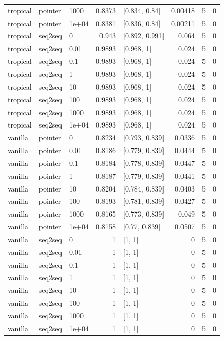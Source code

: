 \documentclass[10pt]{article}
\begin{document}
{\begin{longtable}{lllrlrrr}
tropical & pointer & 1000 & 0.8373 & [0.834, 0.84] & 0.00418 & 5 & 0\\
tropical & pointer & 1e+04 & 0.8381 & [0.836, 0.84] & 0.00211 & 5 & 0\\
tropical & seq2seq & 0 & 0.943 & [0.892, 0.991] & 0.064 & 5 & 0\\
tropical & seq2seq & 0.01 & 0.9893 & [0.968, 1] & 0.024 & 5 & 0\\
tropical & seq2seq & 0.1 & 0.9893 & [0.968, 1] & 0.024 & 5 & 0\\
tropical & seq2seq & 1 & 0.9893 & [0.968, 1] & 0.024 & 5 & 0\\
tropical & seq2seq & 10 & 0.9893 & [0.968, 1] & 0.024 & 5 & 0\\
tropical & seq2seq & 100 & 0.9893 & [0.968, 1] & 0.024 & 5 & 0\\
tropical & seq2seq & 1000 & 0.9893 & [0.968, 1] & 0.024 & 5 & 0\\
tropical & seq2seq & 1e+04 & 0.9893 & [0.968, 1] & 0.024 & 5 & 0\\
vanilla & pointer & 0 & 0.8234 & [0.793, 0.839] & 0.0336 & 5 & 0\\
vanilla & pointer & 0.01 & 0.8186 & [0.779, 0.839] & 0.0444 & 5 & 0\\
vanilla & pointer & 0.1 & 0.8184 & [0.778, 0.839] & 0.0447 & 5 & 0\\
vanilla & pointer & 1 & 0.8187 & [0.779, 0.839] & 0.0441 & 5 & 0\\
vanilla & pointer & 10 & 0.8204 & [0.784, 0.839] & 0.0403 & 5 & 0\\
vanilla & pointer & 100 & 0.8193 & [0.781, 0.839] & 0.0427 & 5 & 0\\
vanilla & pointer & 1000 & 0.8165 & [0.773, 0.839] & 0.049 & 5 & 0\\
vanilla & pointer & 1e+04 & 0.8158 & [0.77, 0.839] & 0.0507 & 5 & 0\\
vanilla & seq2seq & 0 & 1 & [1, 1] & 0 & 5 & 0\\
vanilla & seq2seq & 0.01 & 1 & [1, 1] & 0 & 5 & 0\\
vanilla & seq2seq & 0.1 & 1 & [1, 1] & 0 & 5 & 0\\
vanilla & seq2seq & 1 & 1 & [1, 1] & 0 & 5 & 0\\
vanilla & seq2seq & 10 & 1 & [1, 1] & 0 & 5 & 0\\
vanilla & seq2seq & 100 & 1 & [1, 1] & 0 & 5 & 0\\
vanilla & seq2seq & 1000 & 1 & [1, 1] & 0 & 5 & 0\\
vanilla & seq2seq & 1e+04 & 1 & [1, 1] & 0 & 5 & 0\\
\bottomrule
\end{longtable}
}
\end{document}
